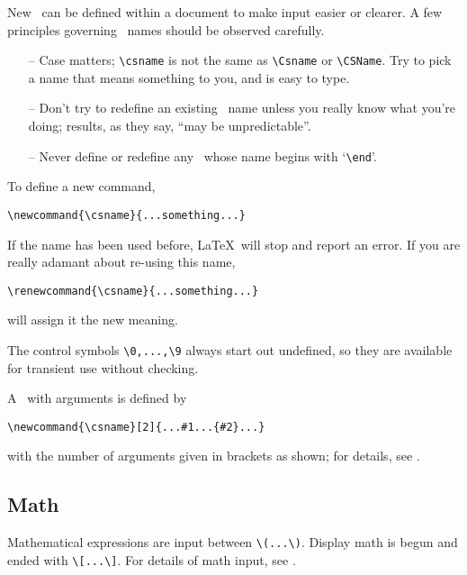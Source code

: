 \noindent
New \css\ can be defined within a document to make input easier or clearer.
A few principles governing \cs\ names should be observed carefully.
\begin{itemize}
\item[--] Case matters; \verb|\csname| is not the same as
        \verb|\Csname| or \verb|\CSName|.
        Try to pick a name that means something to you, and is easy to type.
\item[--] Don't try to redefine an existing \cs\ name unless you really
        know what you're doing; results, as they say, ``may be unpredictable''.
\item[--] Never define or redefine any \cs\ whose name begins with
        `\verb|\end|'.
\end{itemize}

\noindent
To define a new command,
\begin{verbatim}
\newcommand{\csname}{...something...}
\end{verbatim}
If the name has been used before, \LaTeX\ will stop and report an
error.  If you are really adamant about re-using this name,
\begin{verbatim}
\renewcommand{\csname}{...something...}
\end{verbatim}
will assign it the new meaning.

The control symbols \verb|\0,...,\9| always start out undefined, so they are
available for transient use without checking.

A \cs\ with arguments is defined by
\begin{verbatim}
\newcommand{\csname}[2]{...#1...{#2}...}
\end{verbatim}
with the number of arguments given in brackets as shown; for details,
see \cite{LT}.

\subsection{Math}

Mathematical expressions are input between \verb|\(...\)|.  Display
math is begun and ended with \verb|\[...\]|.  For details of math
input, see \cite{LT}.












